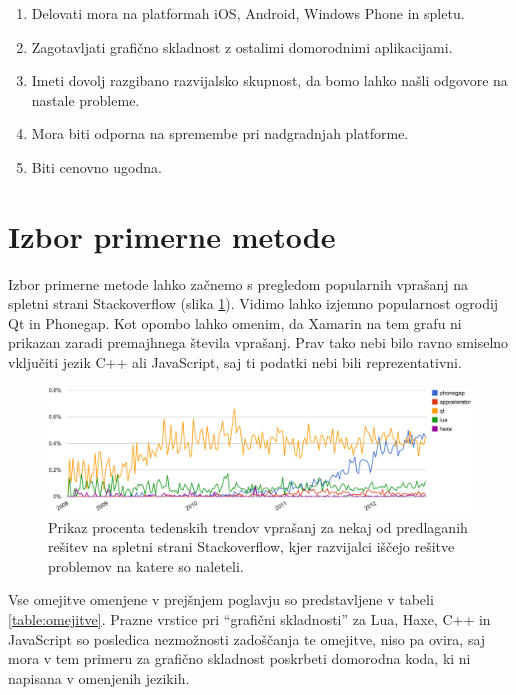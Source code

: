 \begin{enumerate}
  \item Delovati mora na platformah iOS, Android, Windows Phone in spletu.
  \item Zagotavljati grafično skladnost z ostalimi domorodnimi aplikacijami.
  \item Imeti dovolj razgibano razvijalsko skupnost, da bomo lahko našli odgovore na nastale probleme.
  \item Mora biti odporna na spremembe pri nadgradnjah platforme.
  \item Biti cenovno ugodna.
\end{enumerate}

\section{Izbor primerne metode}

Izbor primerne metode lahko začnemo s pregledom popularnih vprašanj na spletni strani Stackoverflow (slika \ref{fig:stackoverflow-trends}). Vidimo lahko izjemno popularnost ogrodij Qt in Phonegap. Kot opombo lahko omenim, da Xamarin na tem grafu ni prikazan zaradi premajhnega števila vprašanj. Prav tako nebi bilo ravno smiselno vključiti jezik C++ ali JavaScript, saj ti podatki nebi bili reprezentativni.

\begin{figure}
 \includegraphics[width=\linewidth]{stackoverflow-trends}
 \caption{Prikaz procenta tedenskih trendov vprašanj za nekaj od predlaganih rešitev na spletni strani Stackoverflow, kjer razvijalci iščejo rešitve problemov na katere so naleteli.}
 \label{fig:stackoverflow-trends}
\end{figure}

Vse omejitve omenjene v prejšnjem poglavju so predstavljene v tabeli \ref{table:omejitve}. Prazne vrstice pri ``grafični skladnosti'' za Lua, Haxe, C++ in JavaScript so posledica nezmožnosti zadoščanja te omejitve, niso pa ovira, saj mora v tem primeru za grafično skladnost poskrbeti domorodna koda, ki ni napisana v omenjenih jezikih.

